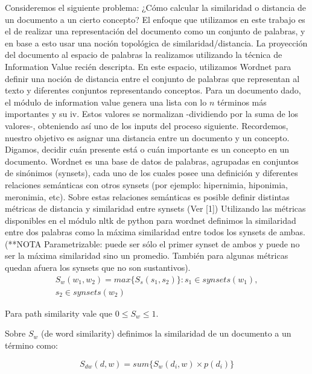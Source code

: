 \documentclass{pnastwo}
\begin{document}
\begin{article}
Consideremos el siguiente problema:
\newline
¿Cómo calcular la similaridad o distancia de un documento a un cierto concepto? 
\newline
El enfoque que utilizamos en este trabajo es el de realizar una representación del documento como un conjunto de palabras, y en base a esto usar una noción topológica de similaridad/distancia. La proyección del documento al espacio de palabras la realizamos utilizando la t\'ecnica de Information Value reci\'en descripta.
En este espacio, utilizamos Wordnet para definir una noción de distancia entre el conjunto de palabras que representan al texto y diferentes conjuntos representando conceptos.
\newline
Para un documento dado, el módulo de information value genera una lista con lo $n$ términos más importantes y su iv. Estos valores se normalizan -dividiendo por la suma de los valores-, obteniendo así uno de los inputs del proceso siguiente. Recordemos, nuestro objetivo es asignar una distancia entre un documento y un concepto. Digamos, decidir cuán presente está o cuán importante es un concepto en un documento.
\newline
Wordnet es una base de datos de palabras, agrupadas en conjuntos de sinónimos (synsets), cada uno de los cuales posee una definición y diferentes relaciones semánticas con otros synsets (por ejemplo: hipernimia, hiponimia, meronimia, etc). Sobre estas relaciones semánticas es posible definir distintas métricas de distancia y similaridad entre synsets (Ver [1])
\newline
Utilizando las métricas disponibles en el módulo nltk de python para wordnet definimos la similaridad entre dos palabras como la máxima similaridad entre todos los synsets de ambas. (**NOTA Parametrizable: puede ser sólo el primer synset de ambos y puede no ser la máxima similaridad sino un promedio. También para algunas métricas quedan afuera los synsets que no son sustantivos). 
\begin{multline}
S_w(w_1, w_2) = max \{ S_s(s_1, s_2) \}: s_1 \in synsets(w_1),\\ s_2 \in synsets(w_2)
\end{multline}

Para path similarity vale que $0 \leq S_w \leq 1$. 

Sobre $S_w$ (de word similarity) definimos la similaridad de un documento a un término como:

\begin{equation}
S_{dw}(d, w) = sum \{ S_w(d_i, w) \times p(d_i)  \} 
\end{equation}


\end{article}
\end{document}
